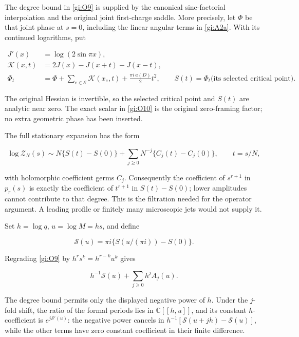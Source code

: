 The degree bound in \eqref{gi:O9} is supplied by the canonical sine-factorial
interpolation and the original joint first-charge saddle. More
precisely, let \(\Phi\) be that joint phase at \(s=0\), including
the linear angular terms in \eqref{gi:A2a}. With its continued logarithms,
put

\begin{equation}\label{gi:O10}
\begin{aligned}
 J'(x)&=\log(2\sin\pi x),\\
 \mathcal K(x,t)&=2J(x)-J(x+t)-J(x-t),\\
 \Phi_t&=\Phi+\sum_{e\in\mathcal E}\mathcal K(x_e,t)
                       +\frac{\pi i\,a(D)}2t^2,\qquad
 S(t)=\Phi_t\bigl(\text{its selected critical point}\bigr).
 \end{aligned}
\end{equation}

The original Hessian is invertible, so the selected critical point
and \(S(t)\) are analytic near zero. The exact scalar in \eqref{gi:O10}
is the original zero-framing factor; no extra geometric phase has
been inserted.

The full stationary expansion has the form

\begin{equation}\label{gi:O11}
\log\mathcal Z_N(s)\sim
  N\{S(t)-S(0)\}
       +\sum_{j\ge0}N^{-j}\{C_j(t)-C_j(0)\},
          \qquad t=s/N,
\end{equation}

with holomorphic coefficient germs \(C_j\). Consequently the
coefficient of \(s^{r+1}\) in \(p_r(s)\) is exactly the coefficient
of \(t^{r+1}\) in \(S(t)-S(0)\); lower amplitudes cannot contribute
to that degree. This is the filtration needed for the operator
argument. A leading profile or finitely many microscopic jets
would not supply it.

Set \(h=\log q\), \(u=\log M=hs\), and define

\begin{equation}\label{gi:O12}
\mathcal S(u)=\pi i\{S(u/(\pi i))-S(0)\}.
\end{equation}

Regrading \eqref{gi:O9} by \(h^rs^k=h^{r-k}u^k\) gives

\begin{equation}\label{gi:O13}
h^{-1}\mathcal S(u)+\sum_{j\ge0}h^jA_j(u).
\end{equation}

The degree bound permits only the displayed negative power of
\(h\). Under the \(j\)-fold shift, the ratio of the formal
periods lies in \(\mathbb C[[h,u]]\), and its constant
\(h\)-coefficient is \(e^{j\mathcal S'(u)}\):
the negative power cancels in
\(h^{-1}[\mathcal S(u+jh)-\mathcal S(u)]\), while the other
terms have zero constant coefficient in their finite difference.

